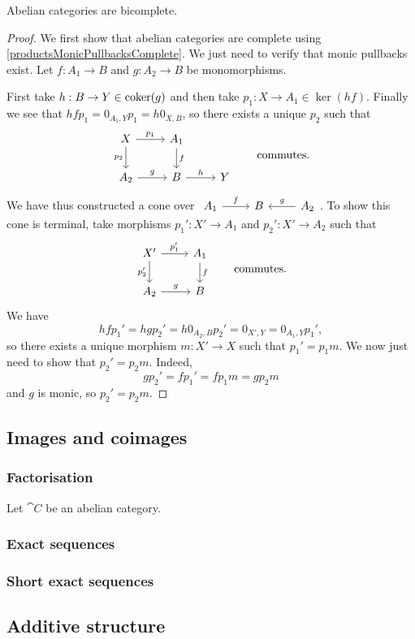 \begin{proposition}
Abelian categories are bicomplete.
\end{proposition}
\begin{proof}
We first show that abelian categories are complete using \ref{productsMonicPullbacksComplete}. We just need to verify that monic pullbacks exist. Let $f: A_1\to B$ and $g: A_2\to B$ be monomorphisms.

First take $h: B\to Y\in \operatorname{coker}(g)$ and then take $p_1: X\to A_1 \in \ker(hf)$. Finally we see that $hfp_1 = 0_{A_1, Y}p_1 = h0_{X,B}$, so there exists a unique $p_2$ such that
\[ \begin{tikzcd}
X \arrow[r, "{p_1}"] \arrow[d, swap, "{p_2}"] & A_1 \arrow[d, "f"] & \\
A_2 \arrow[r, "g"] & B \arrow[r, "h"] & Y
\end{tikzcd} \qquad\text{commutes.} \]
We have thus constructed a cone over $\begin{tikzcd}
A_1 \arrow[r, "f"] & B & \arrow[l, swap, "g"] A_2
\end{tikzcd}$. To show this cone is terminal, take morphisms $p_1': X'\to A_1$ and $p_2': X'\to A_2$ such that
\[ \begin{tikzcd}
X' \arrow[r, "{p_1'}"] \arrow[d, swap, "{p_2'}"] & A_1 \arrow[d, "f"] \\
A_2 \arrow[r, "g"] & B
\end{tikzcd}\qquad \text{commutes.} \]
We have
\[ hfp_1' = hgp_2' = h0_{A_2, B}p_2' = 0_{X',Y} = 0_{A_1, Y}p_1', \]
so there exists a unique morphism $m:X'\to X$ such that $p_1' = p_1m$. We now just need to show that $p_2' = p_2m$. Indeed,
\[ gp_2' = fp_1' = fp_1m = gp_2m \]
and $g$ is monic, so $p_2' = p_2m$.
\end{proof}

\subsection{Images and coimages}
\subsubsection{Factorisation}
\begin{proposition}
Let $\cat{C}$ be an abelian category.
\end{proposition}

\subsubsection{Exact sequences}
\subsubsection{Short exact sequences}

\subsection{Additive structure}